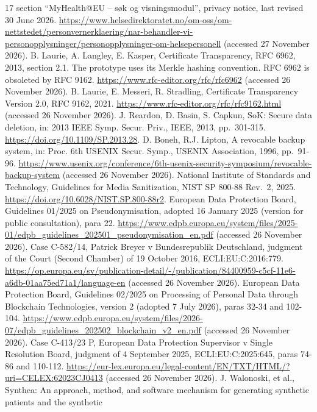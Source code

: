 \documentclass[5p,twocolumn]{elsarticle}
\begin{document}
\begin{thebibliography}{17}
section ``MyHealth@EU -- søk og visningsmodul'', privacy notice, last
revised 30 June 2026.
\url{https://www.helsedirektoratet.no/om-oss/om-nettstedet/personvernerklaering/nar-behandler-vi-personopplysninger/personopplysninger-om-helsepersonell}
(accessed 27 November 2026).
 B. Laurie, A. Langley, E. Kasper, Certificate Transparency, RFC
6962, 2013, section 2.1. The prototype uses its Merkle hashing
convention. RFC 6962 is obsoleted by RFC 9162.
\url{https://www.rfc-editor.org/rfc/rfc6962} (accessed 26 November
2026).
 B. Laurie, E. Messeri, R. Stradling, Certificate Transparency
Version 2.0, RFC 9162, 2021.
\url{https://www.rfc-editor.org/rfc/rfc9162.html} (accessed 26 November
2026).
 J. Reardon, D. Basin, S. Capkun, SoK: Secure data deletion, in:
2013 IEEE Symp. Secur. Priv., IEEE, 2013, pp.~301-315.
\url{https://doi.org/10.1109/SP.2013.28}.
 D. Boneh, R.J. Lipton, A revocable backup system, in: Proc. 6th
USENIX Secur. Symp., USENIX Association, 1996, pp.~91-96.
\url{https://www.usenix.org/conference/6th-usenix-security-symposium/revocable-backup-system}
(accessed 26 November 2026).
 National Institute of Standards and Technology, Guidelines for
Media Sanitization, NIST SP 800-88 Rev.~2, 2025.
\url{https://doi.org/10.6028/NIST.SP.800-88r2}.
 European Data Protection Board, Guidelines 01/2025 on
Pseudonymisation, adopted 16 January 2025 (version for public
consultation), para 22.
\url{https://www.edpb.europa.eu/system/files/2025-01/edpb_guidelines_202501_pseudonymisation_en.pdf}
(accessed 26 November 2026).
 Case C-582/14, Patrick Breyer v Bundesrepublik Deutschland,
judgment of the Court (Second Chamber) of 19 October 2016,
ECLI:EU:C:2016:779.
\url{https://op.europa.eu/sv/publication-detail/-/publication/84400959-c5cf-11e6-a6db-01aa75ed71a1/language-en}
(accessed 26 November 2026).
 European Data Protection Board, Guidelines 02/2025 on
Processing of Personal Data through Blockchain Technologies, version 2
(adopted 7 July 2026), paras 32-34 and 102-104.
\url{https://www.edpb.europa.eu/system/files/2026-07/edpb_guidelines_202502_blockchain_v2_en.pdf}
(accessed 26 November 2026).
 Case C-413/23 P, European Data Protection Supervisor v Single
Resolution Board, judgment of 4 September 2025, ECLI:EU:C:2025:645,
paras 74-86 and 110-112.
\url{https://eur-lex.europa.eu/legal-content/EN/TXT/HTML/?uri=CELEX:62023CJ0413}
(accessed 26 November 2026).
 J. Walonoski, et al., Synthea: An approach, method, and
software mechanism for generating synthetic patients and the synthetic

\end{thebibliography}
\end{document}
